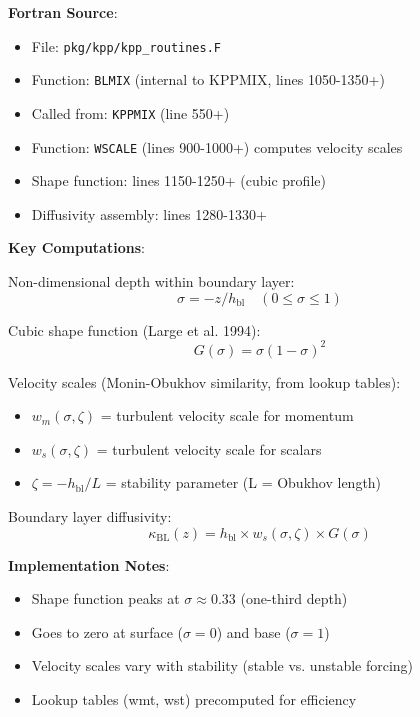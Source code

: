 \documentclass[11pt]{article}
\begin{document}
\textbf{Fortran Source}:
\begin{itemize}
    \item File: \verb|pkg/kpp/kpp_routines.F|
    \item Function: \verb|BLMIX| (internal to KPPMIX, lines 1050-1350+)
    \item Called from: \verb|KPPMIX| (line 550+)
    \item Function: \verb|WSCALE| (lines 900-1000+) computes velocity scales
    \item Shape function: lines 1150-1250+ (cubic profile)
    \item Diffusivity assembly: lines 1280-1330+
\end{itemize}

\textbf{Key Computations}:

Non-dimensional depth within boundary layer:
\begin{equation}
\sigma = -z / h_{\text{bl}} \quad (0 \leq \sigma \leq 1)
\end{equation}

Cubic shape function (Large et al. 1994):
\begin{equation}
G(\sigma) = \sigma (1 - \sigma)^2
\end{equation}

Velocity scales (Monin-Obukhov similarity, from lookup tables):
\begin{itemize}
    \item $w_m(\sigma, \zeta)$ = turbulent velocity scale for momentum
    \item $w_s(\sigma, \zeta)$ = turbulent velocity scale for scalars
    \item $\zeta = -h_{\text{bl}} / L$ = stability parameter (L = Obukhov length)
\end{itemize}

Boundary layer diffusivity:
\begin{equation}
\kappa_{\text{BL}}(z) = h_{\text{bl}} \times w_s(\sigma, \zeta) \times G(\sigma)
\end{equation}

\textbf{Implementation Notes}:
\begin{itemize}
    \item Shape function peaks at $\sigma \approx 0.33$ (one-third depth)
    \item Goes to zero at surface ($\sigma = 0$) and base ($\sigma = 1$)
    \item Velocity scales vary with stability (stable vs. unstable forcing)
    \item Lookup tables (wmt, wst) precomputed for efficiency
\end{itemize}
\end{document}
